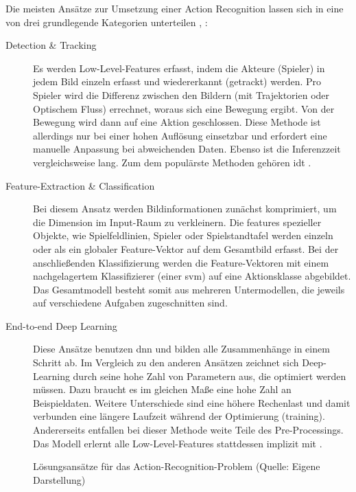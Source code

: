 Die meisten Ansätze zur Umsetzung einer Action Recognition lassen sich in eine von drei grundlegende Kategorien unterteilen \cite{Rahmad18}, \cite{Kothawade19}:

\begin{description}
    \item[Detection \& Tracking] Es werden Low-Level-Features erfasst, indem die Akteure (Spieler) in jedem Bild einzeln erfasst und wiedererkannt (getrackt) werden.
    Pro Spieler wird die Differenz zwischen den Bildern (\zB mit Trajektorien oder Optischem Fluss) errechnet, woraus sich eine Bewegung ergibt.
    Von der Bewegung wird dann auf eine Aktion geschlossen.
    Diese Methode ist allerdings nur bei einer hohen Auflösung einsetzbar und erfordert eine manuelle Anpassung bei abweichenden Daten.
    Ebenso ist die Inferenzzeit vergleichsweise lang.
    Zum dem populärste Methoden gehören \ua \gls{idt} \cite{Wang13}.
    \item[Feature-Extraction \& Classification] Bei diesem Ansatz werden Bildinformationen zunächst komprimiert, um die Dimension im Input-Raum zu verkleinern.
    Die \gls{feature}s spezieller Objekte, wie Spielfeldlinien, Spieler oder Spielstandtafel werden einzeln oder als ein globaler Feature-Vektor auf dem Gesamtbild erfasst.
    Bei der anschließenden Klassifizierung werden die Feature-Vektoren mit einem nachgelagertem Klassifizierer (\zB einer \gls{svm}) auf eine Aktionsklasse abgebildet.
    Das Gesamtmodell besteht somit aus mehreren Untermodellen, die jeweils auf verschiedene Aufgaben zugeschnitten sind.
    \item[End-to-end Deep Learning] Diese Ansätze benutzen \gls{dnn} und bilden alle Zusammenhänge in einem Schritt ab.
    Im Vergleich zu den anderen Ansätzen zeichnet sich Deep-Learning durch seine hohe Zahl von Parametern aus, die optimiert werden müssen.
    Dazu braucht es im gleichen Maße eine hohe Zahl an Beispieldaten.
    Weitere Unterschiede sind eine höhere Rechenlast und damit verbunden eine längere Laufzeit während der Optimierung (\gls{training}).
    Andererseits entfallen bei dieser Methode weite Teile des Pre-Processings.
    Das Modell erlernt alle Low-Level-Features stattdessen implizit mit \cite{Rahmad18}.
\end{description}

\begin{figure}[htbp!]
    \centering
    \caption{Lösungsansätze für das Action-Recognition-Problem (Quelle: Eigene Darstellung)}
    \label{fig:methods}
\end{figure}

